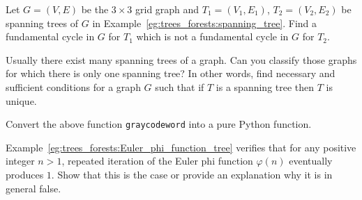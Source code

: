 \begin{problem}
\item Let $G=(V, E)$ be the $3\times 3$ grid graph and $T_1=(V_1,E_1)$,
  $T_2=(V_2,E_2)$ be spanning trees of $G$ in
  Example~\ref{eg:trees_forests:spanning_tree}. Find a fundamental
  cycle in $G$ for $T_1$ which is not a fundamental cycle in $G$ for
  $T_2$.

\item Usually there exist many spanning trees of a graph. Can you
  classify those graphs for which there is only one spanning tree? In
  other words, find necessary and sufficient conditions for a graph
  $G$ such that if $T$ is a spanning tree then $T$ is unique.

\item Convert the above function {\tt graycodeword} into a pure Python
  function.

\item Example~\ref{eg:trees_forests:Euler_phi_function_tree} verifies
  that for any positive integer $n > 1$, repeated iteration of the
  Euler phi function $\varphi(n)$ eventually produces $1$. Show that
  this is the case or provide an explanation why it is in general
  false.


\end{problem}
